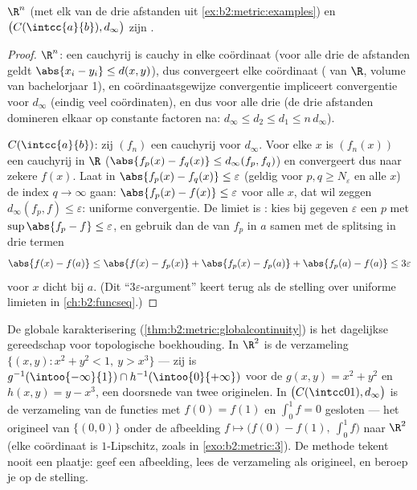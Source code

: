 \begin{theorem}\label{thm:b2:metric:rncomplete}
$\R^n$ (met elk van de drie afstanden uit
\cref{ex:b2:metric:examples}) en $\bigl(C(\intcc{a}{b}),
d_\infty\bigr)$ zijn .
\end{theorem}

\begin{proof}
$\R^n$: een cauchyrij is cauchy in elke coördinaat (voor alle drie
de afstanden geldt $\abs{x_i - y_i} \leq d(x,y)$), dus convergeert
elke coördinaat ( van $\R$, volume van bachelorjaar 1),
en coördinaatsgewijze convergentie impliceert convergentie voor
$d_\infty$ (eindig veel coördinaten), en dus voor alle drie (de
drie afstanden domineren elkaar op constante factoren na:
$d_\infty \leq d_2 \leq d_1 \leq n\,d_\infty$).

$C(\intcc{a}{b})$: zij $(f_n)$ een cauchyrij voor $d_\infty$. Voor
elke $x$ is $(f_n(x))$ een cauchyrij in $\R$ ($\abs{f_p(x) -
f_q(x)} \leq d_\infty(f_p, f_q)$) en convergeert dus naar zekere
$f(x)$. Laat in $\abs{f_p(x) - f_q(x)} \leq \varepsilon$ (geldig
voor $p, q \geq N_\varepsilon$ en alle $x$) de index $q \to \infty$
gaan: $\abs{f_p(x) - f(x)} \leq \varepsilon$ voor alle $x$, dat wil
zeggen $d_\infty(f_p, f) \leq \varepsilon$: uniforme convergentie.
De limiet is : kies bij gegeven $\varepsilon$ een $p$ met
$\sup\abs{f_p - f} \leq \varepsilon$, en gebruik dan de 
van $f_p$ in $a$ samen met de splitsing in drie termen
\[
\abs{f(x) - f(a)} \leq \abs{f(x) - f_p(x)} + \abs{f_p(x) - f_p(a)}
+ \abs{f_p(a) - f(a)} \leq 3\varepsilon
\]
voor $x$ dicht bij $a$. (Dit ``$3\varepsilon$-argument'' keert
terug als de stelling over uniforme limieten in
\cref{ch:b2:funcseq}.)
\end{proof}

\begin{example}\label{ex:b2:metric:recognize}
De globale karakterisering
(\cref{thm:b2:metric:globalcontinuity}) is het dagelijkse
gereedschap voor topologische boekhouding. In $\R^2$ is de
verzameling $\{(x, y) : x^2 + y^2 < 1,\ y > x^3\}$  --- zij is
$g^{-1}(\intoo{-\infty}{1}) \cap h^{-1}(\intoo{0}{+\infty})$ voor
de  $g(x,y) = x^2 + y^2$ en $h(x, y) = y - x^3$, een
doorsnede van twee  originelen. In $\bigl(C(\intcc01),
d_\infty\bigr)$ is de verzameling van de functies met $f(0) = f(1)$
en $\int_0^1 f = 0$ gesloten --- het origineel van $\{(0,0)\}$
onder de  afbeelding $f \mapsto \bigl(f(0) - f(1),\
\int_0^1 f\bigr)$ naar $\R^2$ (elke coördinaat is
$1$-Lipschitz, zoals in \cref{exo:b2:metric:3}). De methode tekent
nooit een plaatje: geef een  afbeelding, lees de
verzameling als origineel, en beroep je op de stelling.
\end{example}

